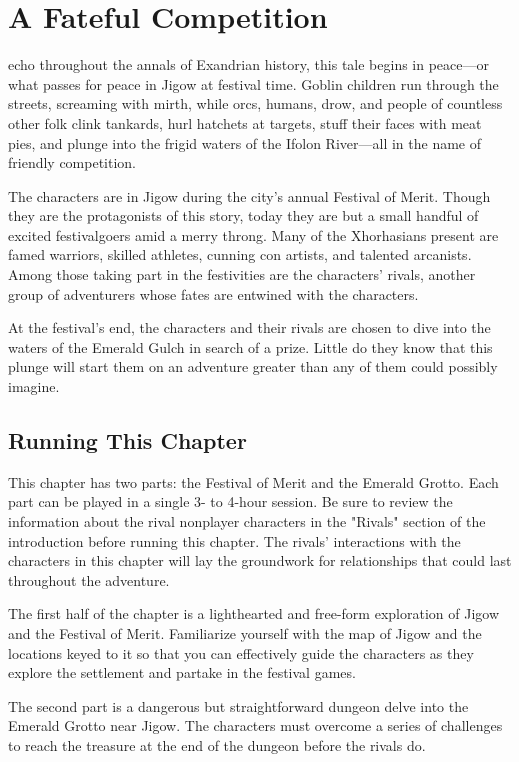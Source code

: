 \documentclass[10pt,a4paper,twoside,bg=print,twocolumn,openany,nodeprecatedcode]{dndbook}
\begin{document}
\twocolumn

\chapter{A Fateful Competition}

 echo throughout the annals of Exandrian history, this tale begins in peace—or what passes for peace in Jigow at festival time. Goblin children run through the streets, screaming with mirth, while orcs, humans, drow, and people of countless other folk clink tankards, hurl hatchets at targets, stuff their faces with meat pies, and plunge into the frigid waters of the Ifolon River—all in the name of friendly competition.

The characters are in Jigow during the city's annual Festival of Merit. Though they are the protagonists of this story, today they are but a small handful of excited festivalgoers amid a merry throng. Many of the Xhorhasians present are famed warriors, skilled athletes, cunning con artists, and talented arcanists. Among those taking part in the festivities are the characters' rivals, another group of adventurers whose fates are entwined with the characters.

At the festival's end, the characters and their rivals are chosen to dive into the waters of the Emerald Gulch in search of a prize. Little do they know that this plunge will start them on an adventure greater than any of them could possibly imagine.

\section{Running This Chapter}
This chapter has two parts: the Festival of Merit and the Emerald Grotto. Each part can be played in a single 3- to 4-hour session. Be sure to review the information about the rival nonplayer characters in the "Rivals" section of the introduction before running this chapter. The rivals' interactions with the characters in this chapter will lay the groundwork for relationships that could last throughout the adventure.

The first half of the chapter is a lighthearted and free-form exploration of Jigow and the Festival of Merit. Familiarize yourself with the map of Jigow and the locations keyed to it so that you can effectively guide the characters as they explore the settlement and partake in the festival games.

The second part is a dangerous but straightforward dungeon delve into the Emerald Grotto near Jigow. The characters must overcome a series of challenges to reach the treasure at the end of the dungeon before the rivals do.
\end{document}
